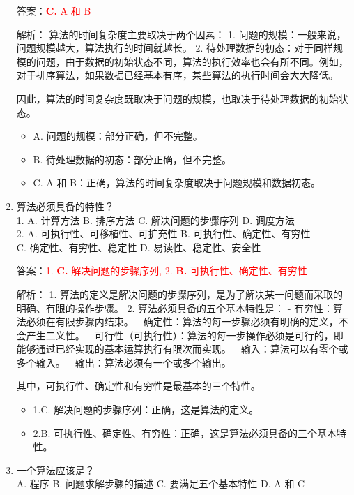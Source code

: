 \documentclass[lang=cn,newtx,10pt,scheme=chinese]{../../../elegantbook}
\begin{document}
\begin{enumerate}
    答案：\textcolor{red}{\textbf{C.} A 和 B}

    解析：
    算法的时间复杂度主要取决于两个因素：
    1. 问题的规模：一般来说，问题规模越大，算法执行的时间就越长。
    2. 待处理数据的初态：对于同样规模的问题，由于数据的初始状态不同，算法的执行效率也会有所不同。例如，对于排序算法，如果数据已经基本有序，某些算法的执行时间会大大降低。
    
    因此，算法的时间复杂度既取决于问题的规模，也取决于待处理数据的初始状态。

    \begin{itemize}
        \item A. 问题的规模：部分正确，但不完整。
        \item B. 待处理数据的初态：部分正确，但不完整。
        \item C. A 和 B：正确，算法的时间复杂度取决于问题规模和数据初态。
    \end{itemize}

    \item 算法必须具备的特性？\\
    1. A. 计算方法 \quad B. 排序方法 \quad C. 解决问题的步骤序列 \quad D. 调度方法\\
    2. A. 可执行性、可移植性、可扩充性 \quad B. 可执行性、确定性、有穷性 \\
       C. 确定性、有穷性、稳定性 \quad D. 易读性、稳定性、安全性

    答案：\textcolor{red}{1. \textbf{C.} 解决问题的步骤序列, 2. \textbf{B.} 可执行性、确定性、有穷性}

    解析：
    1. 算法的定义是解决问题的步骤序列，是为了解决某一问题而采取的明确、有限的操作步骤。
    2. 算法必须具备的五个基本特性是：
       - 有穷性：算法必须在有限步骤内结束。
       - 确定性：算法的每一步骤必须有明确的定义，不会产生二义性。
       - 可行性（可执行性）：算法的每一步操作必须是可行的，即能够通过已经实现的基本运算执行有限次而实现。
       - 输入：算法可以有零个或多个输入。
       - 输出：算法必须有一个或多个输出。
    
    其中，可执行性、确定性和有穷性是最基本的三个特性。

    \begin{itemize}
        \item 1.C. 解决问题的步骤序列：正确，这是算法的定义。
        \item 2.B. 可执行性、确定性、有穷性：正确，这是算法必须具备的三个基本特性。
    \end{itemize}

    \item 一个算法应该是？\\
    A. 程序 \quad B. 问题求解步骤的描述 \quad C. 要满足五个基本特性 \quad D. A 和 C


\end{enumerate}
\end{document}
